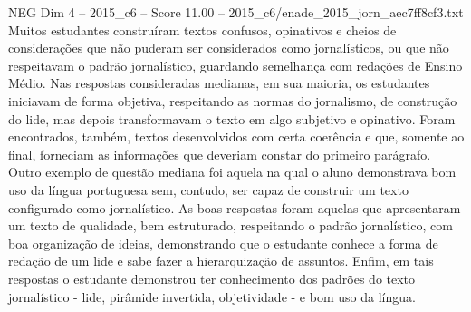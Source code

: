 \begin{textsample}{NEG Dim 4 – 2015\_c6 – Score 11.00 – 2015\_c6/enade\_2015\_jorn\_aec7ff8cf3.txt}
Muitos estudantes construíram textos confusos, opinativos e cheios de considerações que não puderam ser considerados como jornalísticos, ou que não respeitavam o padrão jornalístico, guardando semelhança com redações de Ensino Médio.
Nas respostas consideradas medianas, em sua maioria, os estudantes iniciavam de forma objetiva, respeitando as normas do jornalismo, de construção do lide, mas depois transformavam o texto em algo subjetivo e opinativo.
Foram encontrados, também, textos desenvolvidos com certa coerência e que, somente ao final, forneciam as informações que deveriam constar do primeiro parágrafo.
Outro exemplo de questão mediana foi aquela na qual o aluno demonstrava bom uso da língua portuguesa sem, contudo, ser capaz de construir um texto configurado como jornalístico.
As boas respostas foram aquelas que apresentaram um texto de qualidade, bem estruturado, respeitando o padrão jornalístico, com boa organização de ideias, demonstrando que o estudante conhece a forma de redação de um lide e sabe fazer a hierarquização de assuntos.
Enfim, em tais respostas o estudante demonstrou ter conhecimento dos padrões do texto jornalístico - lide, pirâmide invertida, objetividade - e bom uso da língua.

\end{textsample}
